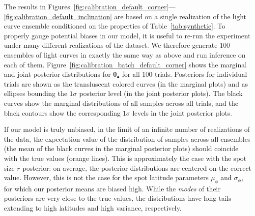 \documentclass[modern]{aastex62}
\begin{document}
The results in
Figures~\ref{fig:calibration_default_corner}---\ref{fig:calibration_default_inclination}
are based on a single realization of the light curve ensemble conditioned on
the properties of Table~\ref{tab:synthetic}. To properly gauge potential biases
in our model, it is useful to re-run the experiment under many different realizations
of the dataset. We therefore generate 100 ensembles of light curves in
exactly the same way as above and run inference on each of them.
Figure~\ref{fig:calibration_batch_default_corner} shows the marginal and joint
posterior distributions for $\pmb{\theta}_\bullet$ for all 100 trials.
Posteriors for individual trials are shown as the transluscent colored curves
(in the marginal plots) and as ellipses bounding the $1\sigma$ posterior level
(in the joint posterior plots). The black curves show the marginal distributions of all
samples across all trials, and the black contours show the corresponding $1\sigma$
levels in the joint posterior plots.

If our model is truly unbiased, in the limit of an infinite number of realizations
of the data, the expectation value of the distribution
of samples across all ensembles (the mean of the black curves in the marginal
posterior plots) should coincide with the true values (orange lines).
This is approximately
the case with the spot size $r$ posterior: on average, the posterior
distributions are centered on the correct value.
However, this is not the case for
the spot latitude parameters $\mu_\phi$ and $\sigma_\phi$, for which our
posterior means are biased high. While the \emph{modes} of their
posteriors are very close to the true values, the distributions have long
tails extending to high latitudes and high variance, respectively.
\end{document}
